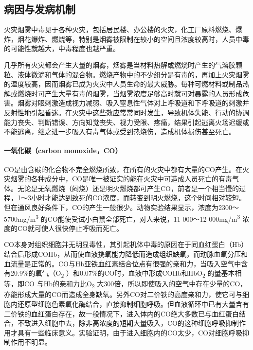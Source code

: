 \subsection{病因与发病机制}

火灾烟雾中毒见于各种火灾，包括居民楼、办公楼的火灾，化工厂原料燃烧、爆炸，烟花爆炸、燃烧等，特别是烟雾被限制在较小的空间且浓度较高时，人员中毒的可能性就越大，中毒程度也越严重。

几乎所有火灾都会产生大量的烟雾，烟雾是当材料热解或燃烧时产生的气溶胶颗粒、液体微滴和气体的混合物。燃烧产物中的不少组分是有毒的，再加上火灾烟雾的温度较高，因而烟雾已成为火灾中人员生命的最大威胁。每种可燃材料或制品热解或燃烧时可产生大量有毒的烟雾，当烟雾浓度足够高时就可对暴露的人员形成危害。烟雾对眼刺激造成视力减弱、吸入窒息性气体对上呼吸道和下呼吸道的刺激并反射性地引起昏迷。在火灾中这些效应常常同时发生，导致机体失能、行动的协调能力丧失、判断错误、方向知觉丧失、视力受限、疼痛，结果引起逃离火场迟缓或不能逃离，继之进一步吸入有毒气体或受到热烧伤，造成机体损伤甚至死亡。

\paragraph{一氧化碳（carbon monoxide，CO）}

CO是由含碳的化合物不完全燃烧所致，在所有的火灾中都有大量的CO产生。在火灾烟雾的各种成分中，CO是唯一被证实的能在火灾中可造成人员死亡的有毒气体。无论是无氧燃烧（闷烧）还是明火燃烧都可产生CO，前者是一个相当慢的过程，1～3小时才能达到致死的CO浓度，而转变到明火燃烧，这个时间相对较短。但在通风良好条件下，CO的产生一般很少。动物实验结果显示，浓度为2300～5700mg/m\textsuperscript{3}
的CO能使受试小白鼠全部死亡，对人来说，11 000～12
000mg/m\textsuperscript{3} 浓度的CO就可使人很快停止呼吸而死亡。

CO本身对组织细胞并无明显毒性，其引起机体中毒的原因在于同血红蛋白（Hb）结合后形成COHb，从而使血液携氧能力降低而造成组织缺氧，而动脉血氧分压和血流量是正常的。CO与Hb亚铁血红素结合位点有很强的亲和力，当吸入空气中含有20.9\%的氧气（O\textsubscript{2}
）和0.07\%的CO时，血液中形成COHb和HbO\textsubscript{2}
的量基本相等，即CO 与Hb的亲和力比O\textsubscript{2}
大300倍，所以即使吸入的空气中存在少量的CO，亦能形成大量的CO而造成全身缺氧。另外CO对二价铁的高度亲和力，使它可与细胞内还原型细胞色素氧化酶结合，直接抑制细胞呼吸。但血液循环中已有大量含有二价铁的血红蛋白存在，故一般情况下，进入体内的CO绝大多数已与血红蛋白结合，不致进入细胞中去，除非高浓度的短期大量吸入，CO的这种细胞呼吸抑制作用才具有一些临床意义。实验证明，由于进入细胞内的CO太少，CO对细胞呼吸抑制作用不明显。

